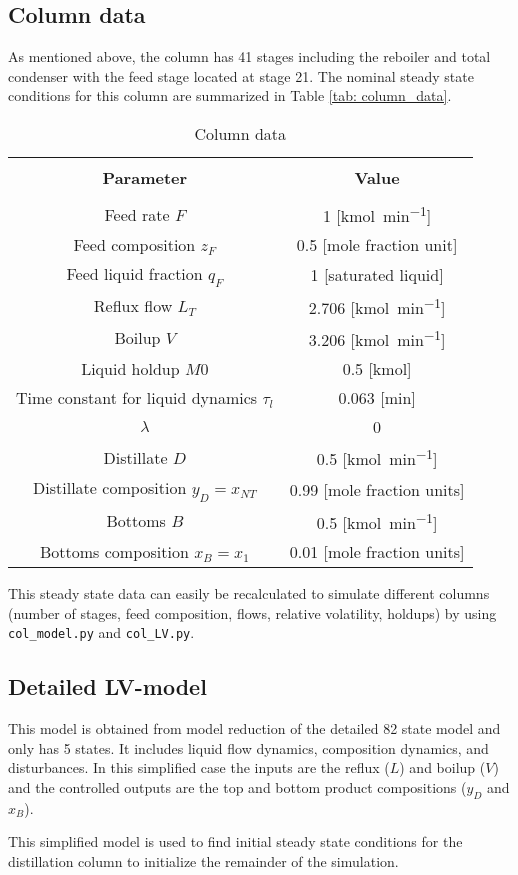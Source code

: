 \subsection{Column data}
As mentioned above, the column has 41 stages including the reboiler and total condenser with the feed stage located at stage 21.
The nominal steady state conditions for this column are summarized in Table \ref{tab: column_data}.
\begin{table}[H]
	\centering
	\caption{Column data}
	\begin{tabular}{c c}
		\toprule[0.5mm]\\
		\textbf{Parameter} & \textbf{Value}\\
		\midrule[0.5mm]\\
		Feed rate $F$ & 1 [\si{\kilo\mole\per\minute}]\\
		Feed composition $z_F$ & 0.5 [mole fraction unit]\\
		Feed liquid fraction $q_F$ & 1 [saturated liquid]\\
		Reflux flow $L_T$ & 2.706 [\si{\kilo\mole\per\minute}]\\
		Boilup $V$ & 3.206 [\si{\kilo\mole\per\minute}]\\
		Liquid holdup $M0$ & 0.5 [\si{\kilo\mole}]\\
		Time constant for liquid dynamics $\tau_l$ & 0.063 [\si{\minute}]\\
		$\lambda$ & 0 \\
		Distillate $D$ & 0.5 [\si{\kilo\mole\per\minute}]\\
		Distillate composition $y_D=x_{NT}$ & 0.99 [mole fraction units]\\
		Bottoms $B$ & 0.5 [\si{\kilo\mole\per\minute}]\\
		Bottoms composition $x_B=x_1$ & 0.01 [mole fraction units]\\
		\bottomrule[0.2mm]
	\end{tabular}
	\label{tab:column_data}
\end{table}
This steady state data can easily be recalculated to simulate different columns (number of stages, feed composition, flows, relative volatility, holdups) by using \texttt{col\_model.py} and \texttt{col\_LV.py}. 
\subsection{Detailed LV-model}
This model is obtained from model reduction of the detailed 82 state model and only has 5 states.
It includes liquid flow dynamics, composition dynamics, and disturbances.
In this simplified case the inputs are the reflux ($L$) and boilup ($V$) and the controlled outputs are the top and bottom product compositions ($y_D$ and $x_B$).
\par
This simplified model is used to find initial steady state conditions for the distillation column to initialize the remainder of the simulation.
